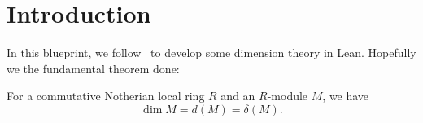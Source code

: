 \chapter{Introduction}

In this blueprint, we follow~\cite{MR1771925} to develop some dimension theory in Lean. Hopefully we the fundamental theorem done:
\begin{theorem}
  For a commutative Notherian local ring $R$ and an $R$-module $M$, we have
  \[
\dim M = d(M) = \delta(M).
  \]
\end{theorem}

